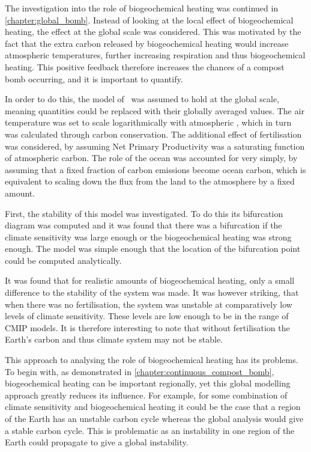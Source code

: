 The investigation into the role of biogeochemical heating was continued in \cref{chapter:global_bomb}. Instead of looking at the local effect of biogeochemical heating,
the effect at the global scale was considered. This was motivated by the fact that the extra carbon released by biogeochemical heating would increase atmospheric temperatures,
further increasing respiration and thus biogeochemical heating.
This positive feedback therefore increases the chances of a compost bomb occurring, and it is important to quantify.

In order to do this, the model of~\cite{Luke2011} was assumed to hold at the global scale, meaning quantities could be replaced with their globally averaged values. The air temperature
was set to scale logarithmically with atmospheric , which in turn was calculated through carbon conservation. The additional effect of  fertilisation was considered,
by assuming Net Primary Productivity was a saturating function of atmospheric carbon. The role of the ocean was accounted for very simply, by assuming that a fixed fraction of
carbon emissions become ocean carbon, which is equivalent to scaling down the flux from the land to the atmosphere by a fixed amount.

First, the stability of this model was investigated. To do this its bifurcation diagram was computed and it was found that there was a bifurcation if the climate sensitivity was large enough
or the biogeochemical heating was strong enough. The model was simple enough that the location of the bifurcation point could be computed analytically. 

It was found that for realistic amounts of biogeochemical heating, only a small difference to the stability of the system was made. It was however striking, that when there was no
 fertilisation, the system was unstable at comparatively low levels of climate sensitivity. These levels are low enough to be in the range of CMIP models. It is therefore interesting to note
that without  fertilisation the Earth's carbon and thus climate system may not be stable.

This approach to analysing the role of biogeochemical heating has its problems. To begin with, as demonstrated in \cref{chapter:continuous_compost_bomb}, biogeochemical heating
can be important regionally, yet this global modelling approach greatly reduces its influence. For example, for some combination of climate sensitivity and biogeochemical heating
it could be the case that a region of the Earth has an unstable carbon cycle whereas the global analysis would give a stable carbon cycle. This is problematic as an instability in one
region of the Earth could propagate to give a global instability.

